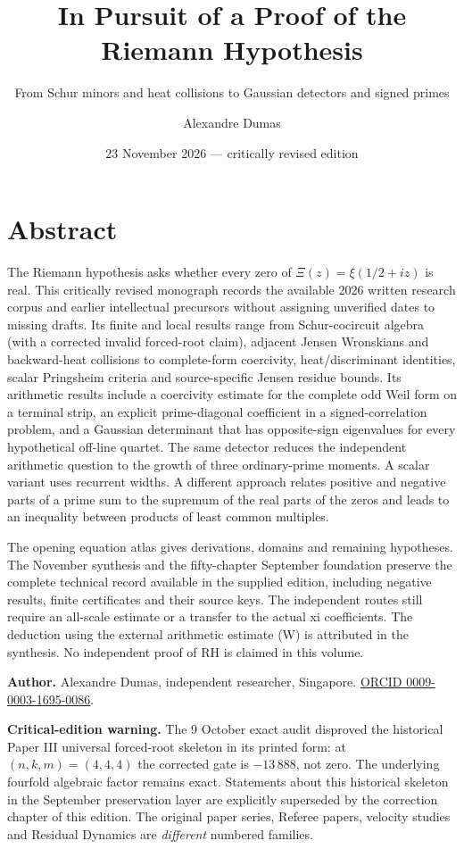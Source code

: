 \documentclass[
  10pt,
  a4paper,
  10pt,
  oneside,
  openany]{book}
\title{In Pursuit of a Proof of the Riemann Hypothesis}
\subtitle{From Schur minors and heat collisions to Gaussian detectors
and signed primes}
\author{Alexandre Dumas}
\date{23 November 2026 --- critically revised edition}
\begin{document}
\frontmatter
\maketitle

{
\hypersetup{linkcolor=}
\setcounter{tocdepth}{1}
\tableofcontents
}
\mainmatter
\section*{Abstract}\label{atlas-abstract}

The Riemann hypothesis asks whether every zero of \(\Xi(z)=\xi(1/2+iz)\)
is real. This critically revised monograph records the available 2026
written research corpus and earlier intellectual precursors without
assigning unverified dates to missing drafts. Its finite and local
results range from Schur-cocircuit algebra (with a corrected invalid
forced-root claim), adjacent Jensen Wronskians and backward-heat
collisions to complete-form coercivity, heat/discriminant identities,
scalar Pringsheim criteria and source-specific Jensen residue bounds.
Its arithmetic results include a coercivity estimate for the complete
odd Weil form on a terminal strip, an explicit prime-diagonal
coefficient in a signed-correlation problem, and a Gaussian determinant
that has opposite-sign eigenvalues for every hypothetical off-line
quartet. The same detector reduces the independent arithmetic question
to the growth of three ordinary-prime moments. A scalar variant uses
recurrent widths. A different approach relates positive and negative
parts of a prime sum to the supremum of the real parts of the zeros and
leads to an inequality between products of least common multiples.

The opening equation atlas gives derivations, domains and remaining
hypotheses. The November synthesis and the fifty-chapter September
foundation preserve the complete technical record available in the
supplied edition, including negative results, finite certificates and
their source keys. The independent routes still require an all-scale
estimate or a transfer to the actual xi coefficients. The deduction
using the external arithmetic estimate (W) is attributed in the
synthesis. No independent proof of RH is claimed in this volume.

\textbf{Author.} Alexandre Dumas, independent researcher, Singapore.
\href{https://orcid.org/0009-0003-1695-0086}{ORCID 0009-0003-1695-0086}.

\textbf{Critical-edition warning.} The 9 October exact audit disproved
the historical Paper III universal forced-root skeleton in its printed
form: at \((n,k,m)=(4,4,4)\) the corrected gate is \(-13\,888\), not
zero. The underlying fourfold algebraic factor remains exact. Statements
about this historical skeleton in the September preservation layer are
explicitly superseded by the correction chapter of this edition. The
original paper series, Referee papers, velocity studies and Residual
Dynamics are \emph{different} numbered families.
\end{document}
